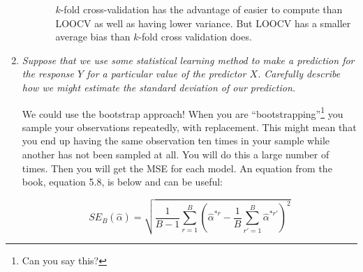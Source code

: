 \documentclass[11pt]{article}
\begin{document}
\begin{enumerate}
\begin{enumerate}
\begin{enumerate}
                $k$-fold cross-validation has the advantage of easier to compute than LOOCV as well as having lower variance. But LOOCV has a smaller average bias than $k$-fold cross validation does. 

        \end{enumerate}

    \end{enumerate}

    \item \textit{Suppose that we use some statistical learning method to make a prediction for the response $Y$ for a particular value of the predictor $X$. Carefully describe how we might estimate the standard deviation of our prediction.}

We could use the bootstrap approach! When you are ``bootstrapping''\footnote{Can you say this?} you sample your observations repeatedly, with replacement. This might mean that you end up having the same observation ten times in your sample while another has not been sampled at all. You will do this a large number of times. Then you will get the MSE for each model. An equation from the book, equation 5.8, is below and can be useful:

$$ SE_B(\hat{\alpha}) = \sqrt{\frac{1}{B - 1}\sum_{r=1}^B\left(\hat{\alpha}^{*r} - \frac{1}{B} \sum_{r'=1}^B\hat{\alpha}^{*r'}\right)^2} $$

\end{enumerate}
\end{document}
